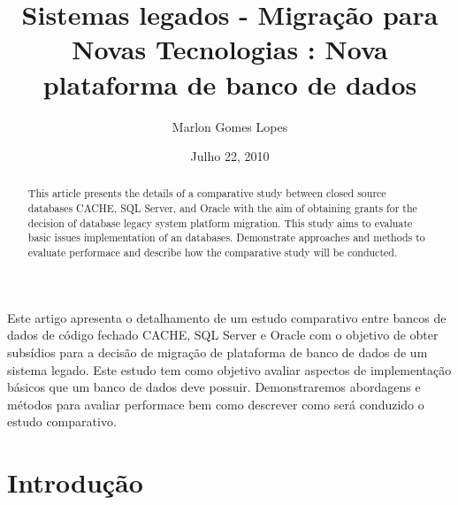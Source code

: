 \documentclass[]{article}
\begin{document}
\date{Julho 22, 2010}   

\sloppy

\title{Sistemas legados -  Migração para Novas Tecnologias : Nova plataforma de banco de dados}
\author{Marlon Gomes Lopes}

\address{
	 Especialização em Tecnologias Aplicadas a Sistemas de Informação com Métodos Ágeis - 4ª Edição \\
         Uniritter \\
         Porto Alegre, RS \\
}

\maketitle

\pagestyle{plain}


\begin{resumo}

Este artigo apresenta o detalhamento de um estudo comparativo entre bancos de dados de código fechado CACHE, SQL Server e Oracle com o objetivo de obter subsídios para a decisão de migração de plataforma de banco de dados de um sistema legado. Este estudo tem como objetivo avaliar aspectos de implementação básicos que um banco de dados deve possuir. Demonstraremos abordagens e métodos para avaliar performace bem como descrever como será conduzido o estudo comparativo. 


\end{resumo}


\begin{abstract}

This article presents the details of a comparative study between closed source databases CACHE, SQL Server, and Oracle with the aim of obtaining grants for the decision of database legacy system platform migration. This study aims to evaluate basic issues implementation of an databases. Demonstrate approaches and methods to evaluate performace and describe how the comparative study will be conducted.


\end{abstract}

\setcounter{page}{1}

\section{Introdução}
\label{cha:introducao}

\end{document}
